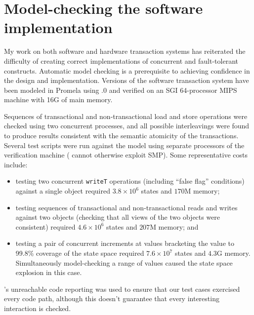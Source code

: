 \chapter{Model-checking the software implementation}\label{sec:verification}

My work on both software and hardware transaction systems has
reiterated the difficulty of creating correct implementations of
concurrent and fault-tolerant constructs.  Automatic model checking is
a prerequisite to achieving confidence in the design and implementation.
Versions of the software transaction system have been modeled in
Promela using .0 and verified on an SGI 64-processor MIPS
machine with 16G of main memory.

Sequences of transactional and non-transactional load and store
operations were checked using two concurrent processes, and all possible
interleavings were found to produce results consistent with
the semantic atomicity of the transactions.  
Several test scripts were run against the
model using separate processors of the verification machine (\Spin
cannot otherwise exploit SMP).  Some representative costs include:
\begin{itemize}
\item testing two concurrent {\tt writeT} operations (including
  ``false flag'' conditions) against a single object required $3.8\times
  10^6$ states and $170$M memory;
\item testing sequences of transactional and non-transactional reads
  and writes against two objects (checking that all views of the two
  objects were consistent) required $4.6\times 10^6$ states and $207$M
  memory; and
\item testing a pair of concurrent increments at values bracketing the
  \FLAG value to 99.8\% coverage of the state space required
  $7.6\times 10^7$ states and $4.3$G memory.  Simultaneously
  model-checking a range of values caused the state space explosion
  in this case.
\end{itemize}
\Spin's unreachable code reporting was used to ensure that our test
cases exercised every code path, although this doesn't guarantee that
every interesting interaction is checked.

